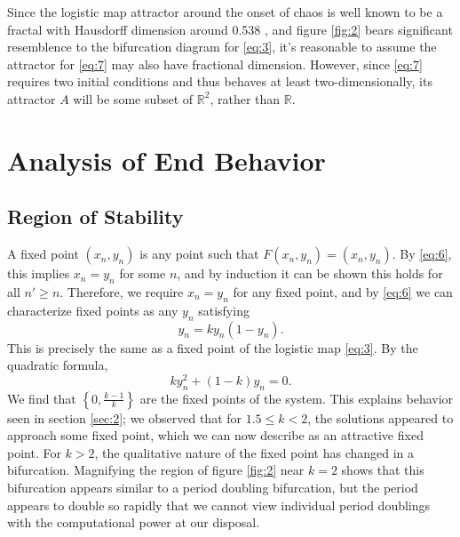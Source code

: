\documentclass[11pt, letterpaper]{article}
\begin{document}
Since the logistic map attractor around the onset of chaos is well known to be a fractal with Hausdorff dimension around 0.538 \cite{grassberger}, and figure \ref{fig:2} bears significant resemblence to the bifurcation diagram for \eqref{eq:3}, it's reasonable to assume the attractor for \eqref{eq:7} may also have fractional dimension. However, since \eqref{eq:7} requires two initial conditions and thus behaves at least two-dimensionally, its attractor $A$ will be some subset of $\mathbb{R}^2$, rather than $\mathbb{R}$.
\section{Analysis of End Behavior}\label{sec:3}
\subsection{Region of Stability}
A fixed point $(x_n,y_n)$ is any point such that $F(x_n,y_n)=(x_n,y_n)$. By \eqref{eq:6}, this implies $x_n=y_n$ for some $n$, and by induction it can be shown this holds for all $n'\geq n$. Therefore, we require $x_n=y_n$ for any fixed point, and by \eqref{eq:6} we can characterize fixed points as any $y_n$ satisfying
\begin{equation}\label{eq:8}
	y_n=ky_n\left( 1-y_n \right) 
.\end{equation}
This is precisely the same as a fixed point of the logistic map \eqref{eq:3}. By the quadratic formula,
\begin{equation}\label{eq:9}
	ky_n^2+(1-k)y_n=0
.\end{equation}
We find that $\left\{ 0,\frac{k-1}{k} \right\} $ are the fixed points of the system. This explains behavior seen in section \ref{sec:2}; we observed that for $1.5\leq k<2$, the solutions appeared to approach some fixed point, which we can now describe as an attractive fixed point. For $k>2$, the qualitative nature of the fixed point has changed in a bifurcation. Magnifying the region of figure \ref{fig:2} near $k=2$ shows that this bifurcation appears similar to a period doubling bifurcation, but the period appears to double so rapidly that we cannot view individual period doublings with the computational power at our disposal.
\end{document}
